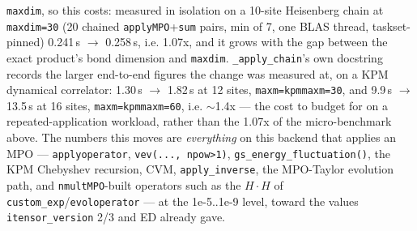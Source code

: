 \documentclass[11pt]{article}
\begin{document}
\texttt{maxdim}, so this costs: measured in isolation on a 10-site
Heisenberg chain at \texttt{maxdim=30} (20 chained
\texttt{applyMPO}+\texttt{sum} pairs, min of 7, one BLAS thread,
taskset-pinned) 0.241\,s $\to$ 0.258\,s, i.e. 1.07x, and it grows with
the gap between the exact product's bond dimension and \texttt{maxdim}.
\texttt{\_apply\_chain}'s own docstring records the larger end-to-end
figures the change was measured at, on a KPM dynamical correlator:
1.30\,s $\to$ 1.82\,s at 12 sites, \texttt{maxm=kpmmaxm=30}, and
9.9\,s $\to$ 13.5\,s at 16 sites, \texttt{maxm=kpmmaxm=60}, i.e. $\sim$1.4x
--- the cost to budget for on a repeated-application workload, rather
than the 1.07x of the micro-benchmark above. The numbers this moves are
\emph{everything} on this backend that applies an MPO ---
\texttt{applyoperator}, \texttt{vev(..., npow>1)},
\texttt{gs\_energy\_fluctuation()}, the KPM Chebyshev recursion, CVM,
\texttt{apply\_inverse}, the MPO-Taylor evolution path, and
\texttt{nmultMPO}-built operators such as the $H\cdot H$ of
\texttt{custom\_exp}/\texttt{evoloperator} --- at the 1e-5..1e-9 level,
toward the values \texttt{itensor\_version} 2/3 and ED already gave.
\end{document}

